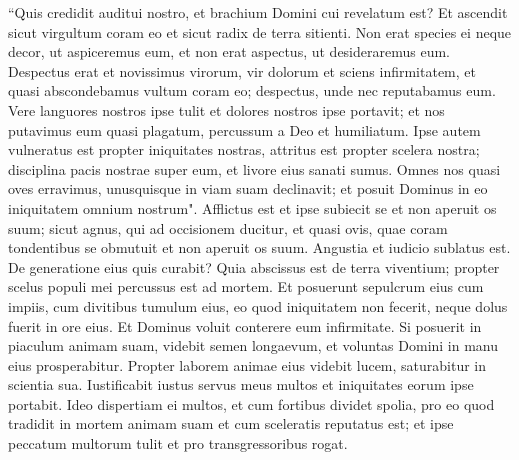\begin{biblechapter}  
\verse “Quis credidit auditui nostro, et brachium Domini cui revelatum est? 
\verse Et ascendit sicut virgultum coram eo et sicut radix de terra sitienti. Non erat species ei neque decor, ut aspiceremus eum, et non erat aspectus, ut desideraremus eum. 
\verse Despectus erat et novissimus virorum, vir dolorum et sciens infirmitatem, et quasi abscondebamus vultum coram eo; despectus, unde nec reputabamus eum. 
\verse Vere languores nostros ipse tulit et dolores nostros ipse portavit; et nos putavimus eum quasi plagatum, percussum a Deo et humiliatum. 
\verse Ipse autem vulneratus est propter iniquitates nostras, attritus est propter scelera nostra; disciplina pacis nostrae super eum, et livore eius sanati sumus. 
\verse Omnes nos quasi oves erravimus, unusquisque in viam suam declinavit; et posuit Dominus in eo iniquitatem omnium nostrum". 
\verse Afflictus est et ipse subiecit se et non aperuit os suum; sicut agnus, qui ad occisionem ducitur, et quasi ovis, quae coram tondentibus se obmutuit et non aperuit os suum. 
\verse Angustia et iudicio sublatus est. De generatione eius quis curabit? Quia abscissus est de terra viventium; propter scelus populi mei percussus est ad mortem. 
\verse Et posuerunt sepulcrum eius cum impiis, cum divitibus tumulum eius, eo quod iniquitatem non fecerit, neque dolus fuerit in ore eius. 
\verse Et Dominus voluit conterere eum infirmitate. Si posuerit in piaculum animam suam, videbit semen longaevum, et voluntas Domini in manu eius prosperabitur. 
\verse Propter laborem animae eius videbit lucem, saturabitur in scientia sua. Iustificabit iustus servus meus multos et iniquitates eorum ipse portabit. 
\verse Ideo dispertiam ei multos, et cum fortibus dividet spolia, pro eo quod tradidit in mortem animam suam et cum sceleratis reputatus est; et ipse peccatum multorum tulit et pro transgressoribus rogat. 
\end{biblechapter}

